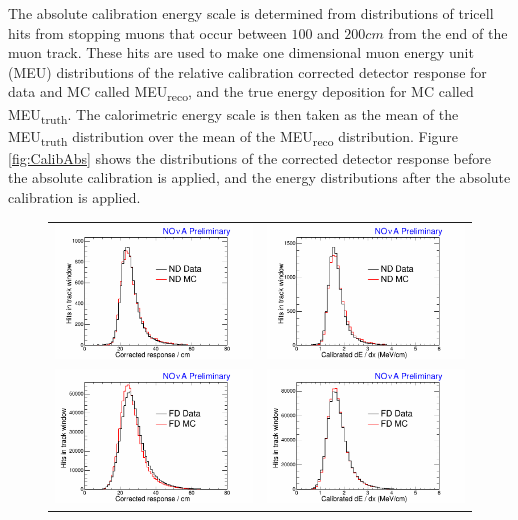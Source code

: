 The absolute calibration energy scale is determined from distributions of tricell hits from stopping muons that occur between $100$ and $200\unit{cm}$ from the end of the muon track. These hits are used to make one dimensional muon energy unit (MEU) distributions of the relative calibration corrected detector response for data and MC called MEU\textsubscript{reco}, and the true energy deposition for MC called MEU\textsubscript{truth}. The calorimetric energy scale is then taken as the mean of the MEU\textsubscript{truth} distribution over the mean of the MEU\textsubscript{reco} distribution. Figure \ref{fig:CalibAbs} shows the distributions of the corrected detector response before the absolute calibration is applied, and the energy distributions after the absolute calibration is applied.
\begin{figure}[htb]
  \centering
  \begin{tabular}{c c}
    \includegraphics[width=.47\textwidth]{figures/Calib/DataMCNDPECorr.png} &
    \includegraphics[width=.47\textwidth]{figures/Calib/DataMCNDdEdx.png} \\
    \includegraphics[width=.47\textwidth]{figures/Calib/DataMCFDPECorr.png} &
    \includegraphics[width=.47\textwidth]{figures/Calib/DataMCFDdEdx.png} \\

\end{tabular}
\end{figure}
